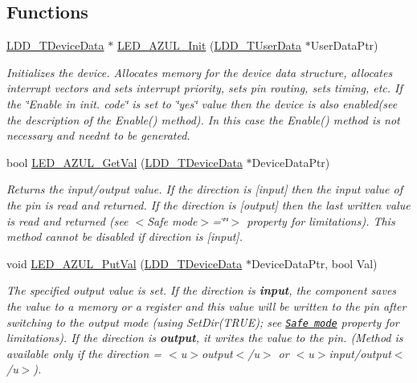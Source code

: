 \subsection*{Functions}
\begin{DoxyCompactItemize}
\item 
\hyperlink{group___p_e___types__module_gac5cf1362f1f0e3a2ce71b1bf2276d091}{L\+D\+D\+\_\+\+T\+Device\+Data} $\ast$ \hyperlink{group___l_e_d___a_z_u_l__module_ga722b94535fb629c7ee54c9008bd5ff44}{L\+E\+D\+\_\+\+A\+Z\+U\+L\+\_\+\+Init} (\hyperlink{group___p_e___types__module_ga0b66a73f87238a782318aa0be7578e35}{L\+D\+D\+\_\+\+T\+User\+Data} $\ast$User\+Data\+Ptr)
\begin{DoxyCompactList}\small\item\em Initializes the device. Allocates memory for the device data structure, allocates interrupt vectors and sets interrupt priority, sets pin routing, sets timing, etc. If the \char`\"{}\+Enable
    in init. code\char`\"{} is set to \char`\"{}yes\char`\"{} value then the device is also enabled(see the description of the Enable() method). In this case the Enable() method is not necessary and needn\textquotesingle{}t to be generated. \end{DoxyCompactList}\item 
bool \hyperlink{group___l_e_d___a_z_u_l__module_gacfb153ddc716a434fc5eabbf41a2f133}{L\+E\+D\+\_\+\+A\+Z\+U\+L\+\_\+\+Get\+Val} (\hyperlink{group___p_e___types__module_gac5cf1362f1f0e3a2ce71b1bf2276d091}{L\+D\+D\+\_\+\+T\+Device\+Data} $\ast$Device\+Data\+Ptr)
\begin{DoxyCompactList}\small\item\em Returns the input/output value. If the direction is \mbox{[}input\mbox{]} then the input value of the pin is read and returned. If the direction is \mbox{[}output\mbox{]} then the last written value is read and returned (see $<$\+Safe mode$>$=\char`\"{}\char`\"{}$>$ property for limitations). This method cannot be disabled if direction is \mbox{[}input\mbox{]}. \end{DoxyCompactList}\item 
void \hyperlink{group___l_e_d___a_z_u_l__module_gaff08319e4556cd54fc899af6e8f2658a}{L\+E\+D\+\_\+\+A\+Z\+U\+L\+\_\+\+Put\+Val} (\hyperlink{group___p_e___types__module_gac5cf1362f1f0e3a2ce71b1bf2276d091}{L\+D\+D\+\_\+\+T\+Device\+Data} $\ast$Device\+Data\+Ptr, bool Val)
\begin{DoxyCompactList}\small\item\em The specified output value is set. If the direction is {\bfseries  input}, the component saves the value to a memory or a register and this value will be written to the pin after switching to the output mode (using {\ttfamily Set\+Dir(\+T\+R\+U\+E)}; see \href{BitIOProperties.html#SafeMode}{\tt Safe mode} property for limitations). If the direction is {\bfseries output}, it writes the value to the pin. (Method is available only if the direction = $<$u$>${\ttfamily output}$<$/u$>$ or $<$u$>${\ttfamily  input/output}$<$/u$>$). \end{DoxyCompactList}\item 

\end{DoxyCompactItemize}
